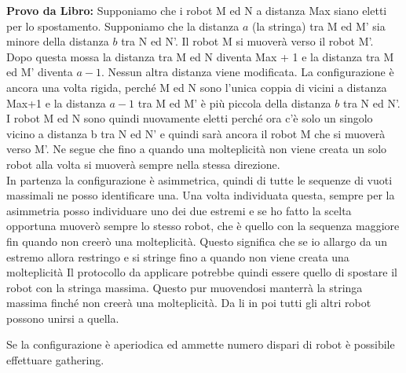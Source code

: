 \textbf{Provo da Libro:} Supponiamo che i robot M ed N a distanza Max siano
eletti per lo spostamento. Supponiamo che la distanza $a$ (la stringa) tra M ed
M' sia minore della distanza $b$ tra N ed N'. Il robot M si muoverà verso il
robot M'. Dopo questa mossa la distanza tra M ed N diventa Max + 1 e la distanza
tra M ed M' diventa $a-1$. Nessun altra distanza viene modificata. La
configurazione è ancora una volta rigida, perché M ed N sono l'unica coppia di
vicini a distanza Max+1 e la distanza $a-1$ tra M ed M' è più piccola della
distanza $b$ tra N ed N'. I robot M ed N sono quindi nuovamente eletti perché
ora c'è solo un singolo vicino a distanza b tra N ed N' e quindi sarà ancora il
robot M che si muoverà verso M'. Ne segue che fino a quando una molteplicità non
viene creata un solo robot alla volta si muoverà sempre nella stessa
direzione.\\
In partenza la configurazione è asimmetrica, quindi di tutte le sequenze di
vuoti massimali ne posso identificare una. Una volta individuata questa, sempre
per la asimmetria posso individuare uno dei due estremi e se ho fatto la scelta
opportuna muoverò sempre lo stesso robot, che è quello con la sequenza maggiore
fin quando non creerò una molteplicità. Questo significa che se io allargo da un
estremo allora restringo e si stringe fino a quando non viene creata una
molteplicità Il protocollo da applicare potrebbe quindi essere quello di
spostare il robot con la stringa massima. Questo pur muovendosi manterrà la
stringa massima finché non creerà una molteplicità. Da li in poi tutti gli altri
robot possono unirsi a quella.

\begin{theorem}
    Se la configurazione è aperiodica ed ammette numero dispari di robot è
    possibile effettuare gathering.
\end{theorem}

